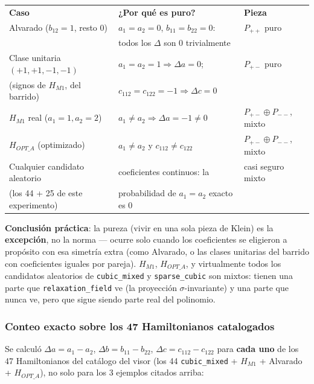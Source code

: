 \documentclass[11pt, a4paper]{article}
\newcommand{\TH}[1]{\cellcolor{cTHbg}\color{white}\textbf{#1}}
\begin{document}
\medskip
\begin{center}
\begin{tabular}{lll}
  \TH{Caso} & \TH{¿Por qu\'e es puro?} & \TH{Pieza} \\[1pt]
  Alvarado ($b_{12}=1$, resto 0) & $a_1{=}a_2{=}0$, $b_{11}{=}b_{22}{=}0$: & $P_{++}$ puro \\
   & todos los $\Delta$ son 0 trivialmente & \\
  Clase unitaria $(+1,+1,-1,-1)$ & $a_1{=}a_2{=}1\Rightarrow\Delta a{=}0$; & $P_{+-}$ puro \\
  (signos de $H_{M1}$, del barrido) & $c_{112}{=}c_{122}{=}{-}1\Rightarrow\Delta c{=}0$ & \\
  $H_{M1}$ real ($a_1{=}1,a_2{=}2$) & $a_1\neq a_2\Rightarrow\Delta a{=}{-}1\neq0$ & $P_{+-}\oplus P_{--}$, mixto \\
  $H_{OPT\_A}$ (optimizado) & $a_1\neq a_2$ y $c_{112}\neq c_{122}$ & $P_{+-}\oplus P_{--}$, mixto \\
  Cualquier candidato aleatorio & coeficientes continuos: la & casi seguro mixto \\
  (los 44 + 25 de este experimento) & probabilidad de $a_1{=}a_2$ exacto es 0 & \\
\end{tabular}
\end{center}
\medskip

\begin{tcolorbox}[quotebox]
  \textbf{Conclusi\'on pr\'actica}: la pureza (vivir en una sola pieza
  de Klein) es la \textbf{excepci\'on}, no la norma --- ocurre solo
  cuando los coeficientes se eligieron a prop\'osito con esa simetr\'ia
  extra (como Alvarado, o las clases unitarias del barrido con
  coeficientes iguales por pareja). $H_{M1}$, $H_{OPT\_A}$, y
  virtualmente todos los candidatos aleatorios de \texttt{cubic\_mixed}
  y \texttt{sparse\_cubic} son mixtos: tienen una parte que
  \texttt{relaxation\_field} ve (la proyecci\'on $\sigma$-invariante) y
  una parte que nunca ve, pero que sigue siendo parte real del
  polinomio.
\end{tcolorbox}

\subsubsection{Conteo exacto sobre los 47 Hamiltonianos catalogados}

Se calcul\'o $\Delta a=a_1{-}a_2$, $\Delta b=b_{11}{-}b_{22}$,
$\Delta c=c_{112}{-}c_{122}$ para \textbf{cada uno} de los 47
Hamiltonianos del cat\'alogo del visor (los 44 \texttt{cubic\_mixed} +
$H_{M1}$ + Alvarado + $H_{OPT\_A}$), no solo para los 3 ejemplos
citados arriba:
\end{document}
